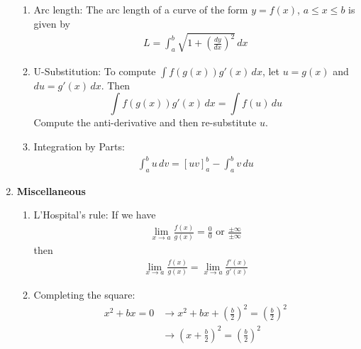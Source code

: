 \documentclass[10pt]{article}
\begin{document}
\begin{multicols}{2}
\begin{enumerate}
\begin{enumerate}
    
    \item Arc length: The arc length of a curve of the form $y=f(x)$, $a \leq x \leq b$ is given by 
    \begin{align*}
        L = \int_a^b \sqrt{1 + \left(\frac{dy}{dx}\right)^2} \, dx
    \end{align*}
    \item U-Substitution: To compute $\int f(g(x))g'(x) \, dx$, let $u=g(x)$ and $du = g'(x) \, dx$. Then $$\int f(g(x))g'(x) \, dx = \int f(u) \, du$$
    Compute the anti-derivative and then re-substitute $u$.
    
    \item Integration by Parts: 
    \begin{align*}
        \int_a^b u \, dv = [uv]_a^b - \int_a^b v \, du
    \end{align*}
    \end{enumerate}
    
    \item \textbf{Miscellaneous}
    \begin{enumerate}
        \item L’Hospital’s rule:
        If we have 
        \begin{align*}
            \lim_{x \rightarrow a} \frac{f(x)}{g(x)} = \frac{0}{0} \text{ or } \frac{\pm\infty}{\pm\infty}
        \end{align*}
        then 
        \begin{align*}
            \lim_{x \rightarrow a} \frac{f(x)}{g(x)} = \lim_{x \rightarrow a} \frac{f'(x)}{g'(x)}
        \end{align*}
        \item Completing the square: 
        \begin{align*}
            x^2 + bx = 0 &\rightarrow x^2 + bx + \left(\frac{b}{2}\right)^2 = \left(\frac{b}{2}\right)^2 \\ & \rightarrow \left(x+\frac{b}{2}\right)^2 = \left(\frac{b}{2}\right)^2
        \end{align*}
    \end{enumerate}
\end{enumerate}
\end{multicols}
\end{document}
